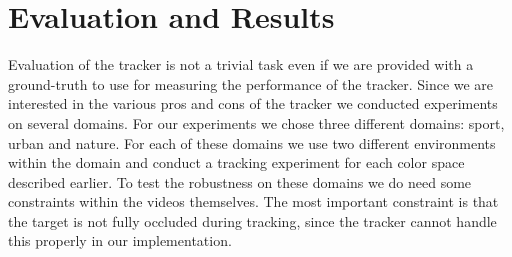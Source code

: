 \documentclass[a4paper,11pt]{article}
\begin{document}
	\section{Evaluation and Results}
		Evaluation of the tracker is not a trivial task even if we are provided with a ground-truth
		to use for measuring the performance of the tracker. Since we are interested in the various
		pros and cons of the tracker we conducted experiments on several domains. For our experiments
		we chose three different domains: sport, urban and nature. For each of these domains we use
		two different environments within the domain and conduct a tracking experiment for each color
		space described earlier. To test the robustness on these domains we do need some constraints
		within the videos themselves. The most important constraint is that the target is not fully
		occluded during tracking, since the tracker cannot handle this properly in our implementation.
\end{document}
